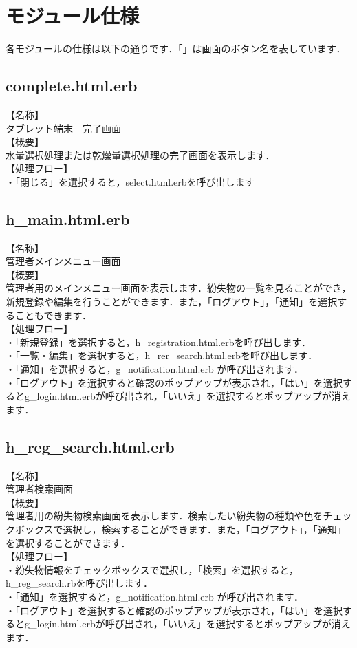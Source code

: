 \documentclass[a4j]{jarticle}
\begin{document}
\section{モジュール仕様}
各モジュールの仕様は以下の通りです．「」は画面のボタン名を表しています．
\subsection{complete.html.erb}
          【名称】\\
            タブレット端末　完了画面\\
           【概要】\\
            水量選択処理または乾燥量選択処理の完了画面を表示します．\\
           【処理フロー】\\
            ・「閉じる」を選択すると，select.html.erbを呼び出します\\
\subsection{h\_main.html.erb}
           【名称】\\
            管理者メインメニュー画面\\
           【概要】\\
            管理者用のメインメニュー画面を表示します．紛失物の一覧を見ることができ，新規登録や編集を行うことができます．また，「ログアウト」，「通知」を選択することもできます．\\
           【処理フロー】\\
            ・「新規登録」を選択すると，h\_registration.html.erbを呼び出します．\\
            ・「一覧・編集」を選択すると，h\_rer\_search.html.erbを呼び出します．\\
            ・「通知」を選択すると，g\_notification.html.erb が呼び出されます．\\
            ・「ログアウト」を選択すると確認のポップアップが表示され，「はい」を選択するとg\_login.html.erbが呼び出され，「いいえ」を選択するとポップアップが消えます．\\
\subsection{h\_reg\_search.html.erb}
           【名称】\\
            管理者検索画面\\
           【概要】\\
            管理者用の紛失物検索画面を表示します．検索したい紛失物の種類や色をチェックボックスで選択し，検索することができます．また，「ログアウト」，「通知」を選択することができます．\\
           【処理フロー】\\
            ・紛失物情報をチェックボックスで選択し，「検索」を選択すると，h\_reg\_search.rbを呼び出します．\\
            ・「通知」を選択すると，g\_notification.html.erb が呼び出されます．\\
            ・「ログアウト」を選択すると確認のポップアップが表示され，「はい」を選択するとg\_login.html.erbが呼び出され，「いいえ」を選択するとポップアップが消えます．\\
\end{document}
